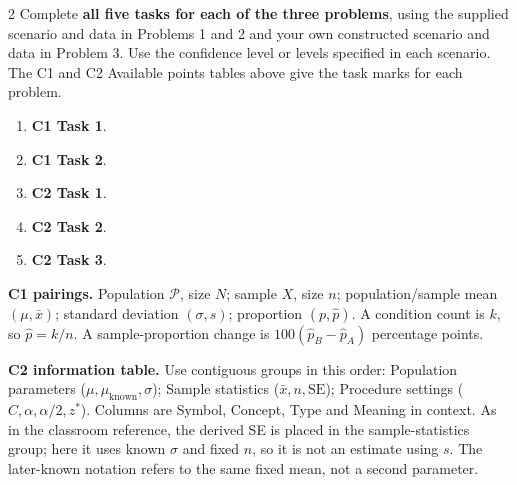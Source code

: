\begin{multicols}{2}
\raggedcolumns
{}
Complete \textbf{all five tasks for each of the three problems}, using the supplied scenario and data in Problems 1 and 2 and your own constructed scenario and data in Problem 3. Use the confidence level or levels specified in each scenario. The C1 and C2 Available points tables above give the task marks for each problem.
\begin{enumerate}[label=(\alph*),itemsep=1pt]
\item \textbf{C1 Task 1}. \cOneA
\item \textbf{C1 Task 2}. \cOneB
\columnbreak
\item \textbf{C2 Task 1}. \cTwoA
\item \textbf{C2 Task 2}. \cTwoB
\item \textbf{C2 Task 3}. \cTwoC
\end{enumerate}

\begingroup\small
\textbf{C1 pairings.} Population $\mathcal P$, size $N$; sample $X$, size $n$; population/sample mean $(\mu,\bar x)$; standard deviation $(\sigma,s)$; proportion $(p,\hat p)$. A condition count is $k$, so $\hat p=k/n$. A sample-proportion change is $100(\hat p_B-\hat p_A)$ percentage points.

\textbf{C2 information table.} Use contiguous groups in this order: Population parameters ($\mu,\mu_{\mathrm{known}},\sigma$); Sample statistics ($\bar x,n,\mathrm{SE}$); Procedure settings ($C,\alpha,\alpha/2,z^*$). Columns are Symbol, Concept, Type and Meaning in context. As in the classroom reference, the derived SE is placed in the sample-statistics group; here it uses known $\sigma$ and fixed $n$, so it is not an estimate using $s$. The later-known notation refers to the same fixed mean, not a second parameter.


\end{multicols}
